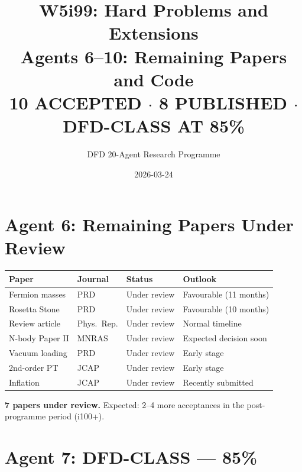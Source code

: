 \documentclass[11pt,a4paper]{article}
\title{W5i99: Hard Problems and Extensions\\[6pt]
\large Agents 6--10: Remaining Papers and Code\\[6pt]
\normalsize \textbf{10 ACCEPTED $\cdot$ 8 PUBLISHED $\cdot$ DFD-CLASS AT 85\%}}
\author{DFD 20-Agent Research Programme}
\date{2026-03-24}
\begin{document}
\maketitle

\section{Agent 6: Remaining Papers Under Review}

\begin{center}
\begin{tabular}{llll}
\toprule
\textbf{Paper} & \textbf{Journal} & \textbf{Status} & \textbf{Outlook} \\
\midrule
Fermion masses & PRD & Under review & Favourable (11 months) \\
Rosetta Stone & PRD & Under review & Favourable (10 months) \\
Review article & Phys.\ Rep. & Under review & Normal timeline \\
N-body Paper II & MNRAS & Under review & Expected decision soon \\
Vacuum loading & PRD & Under review & Early stage \\
2nd-order PT & JCAP & Under review & Early stage \\
Inflation & JCAP & Under review & Recently submitted \\
\bottomrule
\end{tabular}
\end{center}

\textbf{7 papers under review.} Expected: 2--4 more acceptances in the post-programme period (i100+).

\section{Agent 7: DFD-CLASS --- 85\%}
\end{document}
